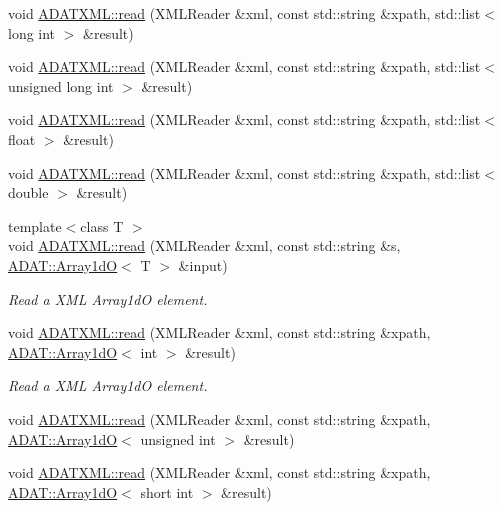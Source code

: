 \begin{DoxyCompactItemize}
\item 
void \mbox{\hyperlink{group__io_ga3369838beeb12ff807171fc5978df1be}{A\+D\+A\+T\+X\+M\+L\+::read}} (X\+M\+L\+Reader \&xml, const std\+::string \&xpath, std\+::list$<$ long int $>$ \&result)
\item 
void \mbox{\hyperlink{group__io_gae359122dfdc08b4e41d5d8f230426192}{A\+D\+A\+T\+X\+M\+L\+::read}} (X\+M\+L\+Reader \&xml, const std\+::string \&xpath, std\+::list$<$ unsigned long int $>$ \&result)
\item 
void \mbox{\hyperlink{group__io_ga1a4d06e4f08869c717ad7db1a8fbfa2f}{A\+D\+A\+T\+X\+M\+L\+::read}} (X\+M\+L\+Reader \&xml, const std\+::string \&xpath, std\+::list$<$ float $>$ \&result)
\item 
void \mbox{\hyperlink{group__io_ga8feeff4a74f8b53707756dc206808983}{A\+D\+A\+T\+X\+M\+L\+::read}} (X\+M\+L\+Reader \&xml, const std\+::string \&xpath, std\+::list$<$ double $>$ \&result)
\item 
{\footnotesize template$<$class T $>$ }\\void \mbox{\hyperlink{group__io_gaba638604c3a98bce5724245a7fad4055}{A\+D\+A\+T\+X\+M\+L\+::read}} (X\+M\+L\+Reader \&xml, const std\+::string \&s, \mbox{\hyperlink{classADAT_1_1Array1dO}{A\+D\+A\+T\+::\+Array1dO}}$<$ T $>$ \&input)
\begin{DoxyCompactList}\small\item\em Read a X\+ML Array1dO element. \end{DoxyCompactList}\item 
void \mbox{\hyperlink{group__io_ga1f304041cae2cc81ec6bd79e94a0f7dd}{A\+D\+A\+T\+X\+M\+L\+::read}} (X\+M\+L\+Reader \&xml, const std\+::string \&xpath, \mbox{\hyperlink{classADAT_1_1Array1dO}{A\+D\+A\+T\+::\+Array1dO}}$<$ int $>$ \&result)
\begin{DoxyCompactList}\small\item\em Read a X\+ML Array1dO element. \end{DoxyCompactList}\item 
void \mbox{\hyperlink{group__io_ga1c554d7ca96ef05f2e5c8d92af1515b9}{A\+D\+A\+T\+X\+M\+L\+::read}} (X\+M\+L\+Reader \&xml, const std\+::string \&xpath, \mbox{\hyperlink{classADAT_1_1Array1dO}{A\+D\+A\+T\+::\+Array1dO}}$<$ unsigned int $>$ \&result)
\item 
void \mbox{\hyperlink{group__io_gaf12f0eb15652e228314c4a67e168688d}{A\+D\+A\+T\+X\+M\+L\+::read}} (X\+M\+L\+Reader \&xml, const std\+::string \&xpath, \mbox{\hyperlink{classADAT_1_1Array1dO}{A\+D\+A\+T\+::\+Array1dO}}$<$ short int $>$ \&result)

\end{DoxyCompactItemize}
